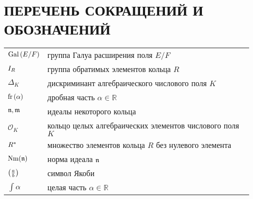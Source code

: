 \documentclass[_00_dissertation.tex]{subfiles}
\begin{document}
\onlyinsubfile{
    \renewcommand{\contentsname}{ОГЛАВЛЕНИЕ}
    \setcounter{tocdepth}{3}
    \tableofcontents
}

\chapter*{ПЕРЕЧЕНЬ СОКРАЩЕНИЙ И ОБОЗНАЧЕНИЙ}

\begin{longtable}{p{}p{}}

    $\textrm{Gal}\left(E/F\right)$ & группа Галуа расширения поля $E/F$\\

    $I_{R}$ & группа обратимых элементов кольца $R$\\

    $\Delta_{K}$ & дискриминант алгебраического числового поля $K$\\

    $\textrm{fr}\left(\alpha\right)$ & дробная часть $\alpha \in \mathbb{R}$\\

    $\mathfrak{n}, \mathfrak{m}$ & идеалы некоторого кольца\\

    $\mathcal{O}_{K}$ & кольцо целых алгебраических элементов числового поля $K$\\

    $R^{*}$ & множество элементов кольца $R$ без нулевого элемента\\

    $\textrm{Nm}(\mathfrak{n})$ & норма идеала $\mathfrak{n}$\\

    $\left(\frac{a}{b}\right)$ & символ Якоби\\

    $\int{\alpha}$ & целая часть $\alpha \in \mathbb{R}$\\

\end{longtable}
\end{document}
